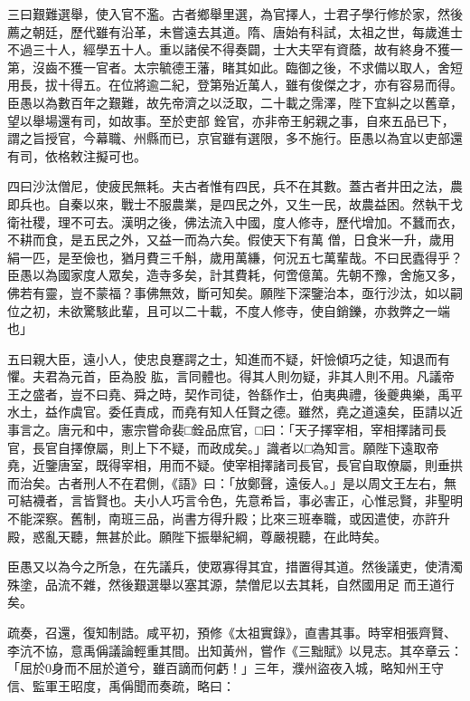 \begin{pinyinscope}
 三曰艱難選舉，使入官不濫。古者鄉舉里選，為官擇人，士君子學行修於家，然後
 薦之朝廷，歷代雖有沿革，未嘗遠去其道。隋、唐始有科試，太祖之世，每歲進士不過三十人，經學五十人。重以諸侯不得奏闢，士大夫罕有資蔭，故有終身不獲一第，沒齒不獲一官者。太宗毓德王藩，睹其如此。臨御之後，不求備以取人，舍短用長，拔十得五。在位將逾二紀，登第殆近萬人，雖有俊傑之才，亦有容易而得。臣愚以為數百年之艱難，故先帝濟之以泛取，二十載之霈澤，陛下宜糾之以舊章，望以舉場還有司，如故事。至於吏部
 銓官，亦非帝王躬親之事，自來五品已下，謂之旨授官，今幕職、州縣而已，京官雖有選限，多不施行。臣愚以為宜以吏部還有司，依格敕注擬可也。



 四曰沙汰僧尼，使疲民無耗。夫古者惟有四民，兵不在其數。蓋古者井田之法，農即兵也。自秦以來，戰士不服農業，是四民之外，又生一民，故農益困。然執干戈衛社稷，理不可去。漢明之後，佛法流入中國，度人修寺，歷代增加。不蠶而衣，不耕而食，是五民之外，又益一而為六矣。假使天下有萬
 僧，日食米一升，歲用絹一匹，是至儉也，猶月費三千斛，歲用萬縑，何況五七萬輩哉。不曰民蠹得乎？臣愚以為國家度人眾矣，造寺多矣，計其費耗，何啻億萬。先朝不豫，舍施又多，佛若有靈，豈不蒙福？事佛無效，斷可知矣。願陛下深鑒治本，亟行沙汰，如以嗣位之初，未欲驚駭此輩，且可以二十載，不度人修寺，使自銷鑠，亦救弊之一端也」



 五曰親大臣，遠小人，使忠良蹇諤之士，知進而不疑，奸憸傾巧之徒，知退而有懼。夫君為元首，臣為股
 肱，言同體也。得其人則勿疑，非其人則不用。凡議帝王之盛者，豈不曰堯、舜之時，契作司徒，咎繇作士，伯夷典禮，後夔典樂，禹平水土，益作虞官。委任責成，而堯有知人任賢之德。雖然，堯之道遠矣，臣請以近事言之。唐元和中，憲宗嘗命裴□銓品庶官，□曰：「天子擇宰相，宰相擇諸司長官，長官自擇僚屬，則上下不疑，而政成矣。」識者以□為知言。願陛下遠取帝堯，近鑒唐室，既得宰相，用而不疑。使宰相擇諸司長官，長官自取僚屬，則垂拱
 而治矣。古者刑人不在君側，《語》曰：「放鄭聲，遠佞人。」是以周文王左右，無可結襪者，言皆賢也。夫小人巧言令色，先意希旨，事必害正，心惟忌賢，非聖明不能深察。舊制，南班三品，尚書方得升殿；比來三班奉職，或因遣使，亦許升殿，惑亂天聽，無甚於此。願陛下振舉紀綱，尊嚴視聽，在此時矣。



 臣愚又以為今之所急，在先議兵，使眾寡得其宜，措置得其道。然後議吏，使清濁殊塗，品流不雜，然後艱選舉以塞其源，禁僧尼以去其耗，自然國用足
 而王道行矣。



 疏奏，召還，復知制誥。咸平初，預修《太祖實錄》，直書其事。時宰相張齊賢、李沆不協，意禹偁議論輕重其間。出知黃州，嘗作《三黜賦》以見志。其卒章云：「屈於0身而不屈於道兮，雖百謫而何虧！」三年，濮州盜夜入城，略知州王守信、監軍王昭度，禹偁聞而奏疏，略曰：




\end{pinyinscope}
